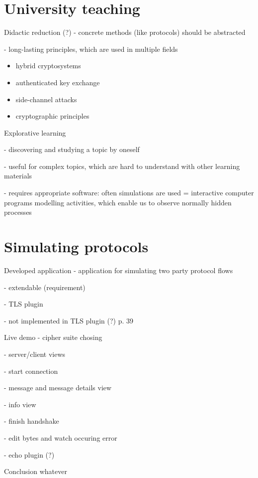 \section{University teaching}
%

\begin{frame}{Didactic reduction (?)}
- concrete methods (like protocols) should be abstracted

- long-lasting principles, which are used in multiple fields

\begin{itemize}
	\item hybrid cryptosystems 
	\item authenticated key exchange
	\item side-channel attacks
	\item cryptographic principles
\end{itemize}

\end{frame}

\begin{frame}{Explorative learning}

- discovering and studying a topic by oneself

- useful for complex topics, which are hard to understand with other learning materials

- requires appropriate software: often simulations are used = interactive computer programs modelling activities, which enable us to observe normally hidden processes
 
\end{frame}

\section{Simulating protocols}


\begin{frame} {Developed application}
- application for simulating two party protocol flows

- extendable (requirement)

- TLS plugin

	- not implemented in TLS plugin (?) p. 39  
\end{frame}

\begin{frame} {Live demo}
- cipher suite chosing

- server/client views

- start connection 

- message and message details view

- info view

- finish handshake

- edit bytes and watch occuring error

- echo plugin (?)

\end{frame}

\begin{frame}{Conclusion}
whatever
\end{frame}

